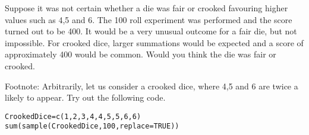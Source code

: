\documentclass[]{article}
\begin{document}
Suppose it was not certain whether a die was fair or crooked favouring higher values such as 4,5 and 6. The 100 roll experiment was performed and the score turned out to be 400.  It would be a very unusual outcome for a fair die, but not impossible. For crooked dice, larger summations would be expected and a score of approximately 400 would be common. Would you think the die was fair or crooked.

Footnote: Arbitrarily, let us consider a crooked dice, where 4,5 and 6 are twice a likely to appear. Try out the following code.
\begin{verbatim}
CrookedDice=c(1,2,3,4,4,5,5,6,6)
sum(sample(CrookedDice,100,replace=TRUE))
\end{verbatim}
\end{document}
